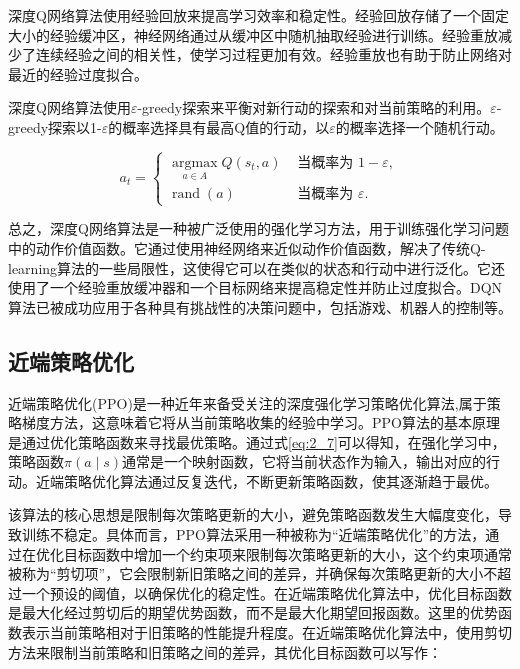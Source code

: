 深度Q网络算法使用经验回放来提高学习效率和稳定性。经验回放存储了一个固定大小的经验缓冲区，神经网络通过从缓冲区中随机抽取经验进行训练。经验重放减少了连续经验之间的相关性，使学习过程更加有效。经验重放也有助于防止网络对最近的经验过度拟合。

深度Q网络算法使用$\varepsilon$-greedy探索来平衡对新行动的探索和对当前策略的利用。$\varepsilon$-greedy探索以1-$\varepsilon$的概率选择具有最高Q值的行动，以$\varepsilon$的概率选择一个随机行动。

\begin{equation}
\label{eq:2_23}
{a}_{t}= \begin{cases}\underset{{a} \in A}{\operatorname{argmax}} Q\left({s}_{t} ,{a}\right) & \text { 当概率为 } 1-\varepsilon, \\ \operatorname{rand}({a}) & \text { 当概率为 } \varepsilon.\end{cases}
\end{equation}


总之，深度Q网络算法是一种被广泛使用的强化学习方法，用于训练强化学习问题中的动作价值函数。它通过使用神经网络来近似动作价值函数，解决了传统Q-learning算法的一些局限性，这使得它可以在类似的状态和行动中进行泛化。它还使用了一个经验重放缓冲器和一个目标网络来提高稳定性并防止过度拟合。DQN算法已被成功应用于各种具有挑战性的决策问题中，包括游戏、机器人的控制等。


\subsection{近端策略优化}

近端策略优化(PPO)是一种近年来备受关注的深度强化学习策略优化算法,属于策略梯度方法，这意味着它将从当前策略收集的经验中学习。PPO算法的基本原理是通过优化策略函数来寻找最优策略。通过式\ref{eq:2_7}可以得知，在强化学习中，策略函数$\pi(a \mid s)$通常是一个映射函数，它将当前状态作为输入，输出对应的行动。近端策略优化算法通过反复迭代，不断更新策略函数，使其逐渐趋于最优。

该算法的核心思想是限制每次策略更新的大小，避免策略函数发生大幅度变化，导致训练不稳定。具体而言，PPO算法采用一种被称为“近端策略优化”的方法，通过在优化目标函数中增加一个约束项来限制每次策略更新的大小，这个约束项通常被称为“剪切项”，它会限制新旧策略之间的差异，并确保每次策略更新的大小不超过一个预设的阈值，以确保优化的稳定性。在近端策略优化算法中，优化目标函数是最大化经过剪切后的期望优势函数，而不是最大化期望回报函数。这里的优势函数表示当前策略相对于旧策略的性能提升程度。在近端策略优化算法中，使用剪切方法来限制当前策略和旧策略之间的差异，其优化目标函数可以写作：

